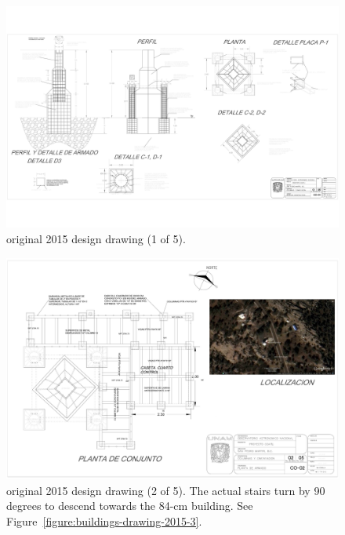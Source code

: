 \begin{figure}
\begin{center}
\includegraphics[height=0.95\linewidth,angle=90]{figures/buildings-coatli-drawing-2015-1.pdf}
\end{center}
\caption{{\projectname} original 2015 design drawing (1 of 5).}
\label{figure:buildings-drawing-2015-1}
\end{figure}

\begin{figure}
\begin{center}
\includegraphics[height=0.95\linewidth,angle=90]{figures/buildings-coatli-drawing-2015-2.pdf}
\end{center}
\caption{{\projectname} original 2015 design drawing (2 of 5). The actual stairs turn by 90 degrees to descend towards the 84-cm building. See Figure~\ref{figure:buildings-drawing-2015-3}.}
\label{figure:buildings-drawing-2015-2}
\end{figure}

